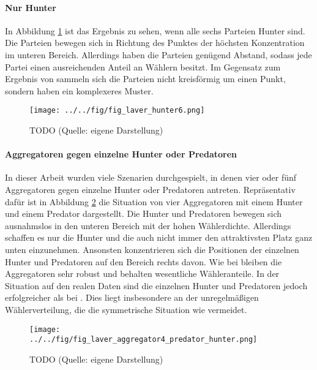 \paragraph{Nur Hunter}

In Abbildung \ref{fig:laver-hunter6} ist das Ergebnis zu sehen, wenn alle sechs Parteien Hunter sind. Die Parteien bewegen sich in Richtung des Punktes der höchsten Konzentration im unteren Bereich. Allerdings haben die Parteien genügend Abstand, sodass jede Partei einen ausreichenden Anteil an Wählern besitzt. Im Gegensatz zum Ergebnis von \citet{laver2005policy} sammeln sich die Parteien nicht kreisförmig um einen Punkt, sondern haben ein komplexeres Muster.

\begin{figure}[htb]
	\centering
	\texttt{[image: ../../fig/fig\_laver\_hunter6.png]}
	\caption{TODO (Quelle: eigene Darstellung)}
	\label{fig:laver-hunter6}
\end{figure}

\paragraph{Aggregatoren gegen einzelne Hunter oder Predatoren}

In dieser Arbeit wurden viele Szenarien durchgespielt, in denen vier oder fünf Aggregatoren gegen einzelne Hunter oder Predatoren antreten. Repräsentativ dafür ist in Abbildung \ref{fig:laver-aggregator4-hunter-predator} die Situation von vier Aggregatoren mit einem Hunter und einem Predator dargestellt. Die Hunter und Predatoren bewegen sich ausnahmslos in den unteren Bereich mit der hohen Wählerdichte. Allerdings schaffen es nur die Hunter und die auch nicht immer den attraktivsten Platz ganz unten einzunehmen. Ansonsten konzentrieren sich die Positionen der einzelnen Hunter und Predatoren auf den Bereich rechts davon. Wie bei \citet{laver2005policy} bleiben die Aggregatoren sehr robust und behalten wesentliche Wähleranteile. In der Situation auf den realen Daten sind die einzelnen Hunter und Predatoren jedoch erfolgreicher als bei \citet{laver2005policy}. Dies liegt insbesondere an der unregelmäßigen Wählerverteilung, die die symmetrische Situation wie \citet{laver2005policy} vermeidet.

\begin{figure}[htb]
	\centering
	\texttt{[image: ../../fig/fig\_laver\_aggregator4\_predator\_hunter.png]}
	\caption{TODO (Quelle: eigene Darstellung)}
	\label{fig:laver-aggregator4-hunter-predator}
\end{figure}

